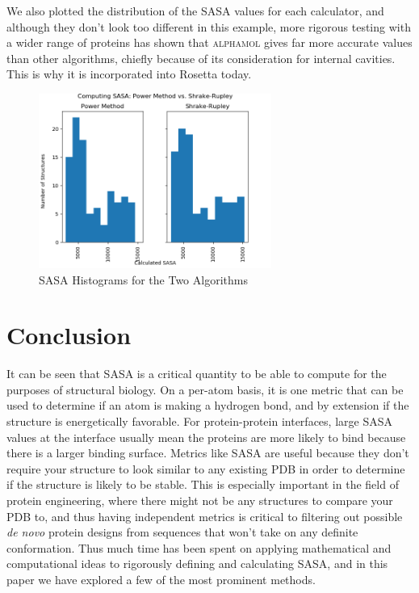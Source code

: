 \documentclass{article}
\begin{document}
We also plotted the distribution of the SASA values for each calculator, and although they don't look too different in this example, more rigorous testing with a wider range of proteins has shown that \textsc{alphamol} gives far more accurate values than other algorithms, chiefly because of its consideration for internal cavities. This is why it is incorporated into Rosetta today.
\begin{figure}
\caption{SASA Histograms for the Two Algorithms}
\centerline{\includegraphics[width=3in]{sasa}}
\end{figure}

\section{Conclusion}
It can be seen that SASA is a critical quantity to be able to compute for the purposes of structural biology. On a per-atom basis, it is one metric that can be used to determine if an atom is making a hydrogen bond, and by extension if the structure is energetically favorable. For protein-protein interfaces, large SASA values at the interface usually mean the proteins are more likely to bind because there is a larger binding surface. Metrics like SASA are useful because they don't require your structure to look similar to any existing PDB in order to determine if the structure is likely to be stable. This is especially important in the field of protein engineering, where there might not be any structures to compare your PDB to, and thus having independent metrics is critical to filtering out possible \textit{de novo} protein designs from sequences that won't take on any definite conformation. Thus much time has been spent on applying mathematical and computational ideas to rigorously defining and calculating SASA, and in this paper we have explored a few of the most prominent methods.
\end{document}
